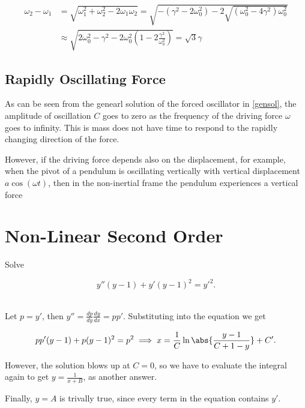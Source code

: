 \documentclass[english,a4paper,12pt]{report}
\begin{document}
\begin{equation}
    \begin{aligned} 
    \omega _{2} - \omega _{1} &= \sqrt{\omega _{1}^2+\omega _{2}^2-2\omega _{1}\omega _{2}} = \sqrt{-(\gamma ^2-2\omega _{0}^2 ) -2 \sqrt{(\omega _{0}^2 - 4\gamma ^2 )\omega _{0}^2 } } \\ &\approx \sqrt{2\omega _{0}^2 -\gamma ^2 - 2\omega _{0}^2 \left( 1 -2\frac{\gamma ^2}{\omega _{0}^2 }  \right)  } = \sqrt{3}\gamma  
    \end{aligned} 
\end{equation}

\subsection{Rapidly Oscillating Force}

As can be seen from the genearl solution of the forced oscillator in \cref{gensol}, the amplitude of oscillation \(C\) goes to zero as the frequency of the driving force \(\omega \) goes to infinity. This is mass does not have time to respond to the rapidly changing direction of the force. 

However, if the driving force depends also on the displacement, for example, when the pivot of a pendulum is oscillating vertically with vertical displacement \(a \cos (\omega t)\), then in the non-inertial frame the pendulum experiences a vertical force   



\section{Non-Linear Second Order}

{Solve 

\begin{equation}
    y''(y-1)+y'(y-1)^2=y'^2.
\end{equation}~
}
{Let \(p = y'\), then \(\displaystyle y''=\frac{dp}{dy} \frac{dy}{dx} = p p'  \). Substituting into the equation we get

\begin{equation}
    p p' (y-1) + p(y-1)^2 = p^2 \implies x = \frac{1}{C} \ln \abs{\frac{y-1}{C+1-y} } +C'. 
\end{equation}

However, the solution blows up at \(C = 0\), so we have to evaluate the integral again to get \(y = \frac{1}{x+B} \), as another answer. 

Finally, \(y = A\) is trivally true, since every term in the equation contains \(y'\). 
}
\end{document}
